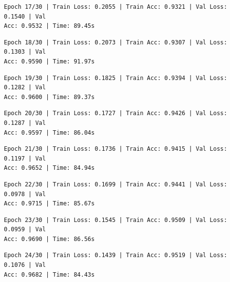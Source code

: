 \documentclass[11pt]{article}
\begin{document}
    \begin{Verbatim}[commandchars=\\\{\}]
Epoch 17/30 | Train Loss: 0.2055 | Train Acc: 0.9321 | Val Loss: 0.1540 | Val
Acc: 0.9532 | Time: 89.45s
    \end{Verbatim}

    \begin{Verbatim}[commandchars=\\\{\}]
Epoch 18/30 | Train Loss: 0.2073 | Train Acc: 0.9307 | Val Loss: 0.1303 | Val
Acc: 0.9590 | Time: 91.97s
    \end{Verbatim}

    \begin{Verbatim}[commandchars=\\\{\}]
Epoch 19/30 | Train Loss: 0.1825 | Train Acc: 0.9394 | Val Loss: 0.1282 | Val
Acc: 0.9600 | Time: 89.37s
    \end{Verbatim}

    \begin{Verbatim}[commandchars=\\\{\}]
Epoch 20/30 | Train Loss: 0.1727 | Train Acc: 0.9426 | Val Loss: 0.1287 | Val
Acc: 0.9597 | Time: 86.04s
    \end{Verbatim}

    \begin{Verbatim}[commandchars=\\\{\}]
Epoch 21/30 | Train Loss: 0.1736 | Train Acc: 0.9415 | Val Loss: 0.1197 | Val
Acc: 0.9652 | Time: 84.94s
    \end{Verbatim}

    \begin{Verbatim}[commandchars=\\\{\}]
Epoch 22/30 | Train Loss: 0.1699 | Train Acc: 0.9441 | Val Loss: 0.0978 | Val
Acc: 0.9715 | Time: 85.67s
    \end{Verbatim}

    \begin{Verbatim}[commandchars=\\\{\}]
Epoch 23/30 | Train Loss: 0.1545 | Train Acc: 0.9509 | Val Loss: 0.0959 | Val
Acc: 0.9690 | Time: 86.56s
    \end{Verbatim}

    \begin{Verbatim}[commandchars=\\\{\}]
Epoch 24/30 | Train Loss: 0.1439 | Train Acc: 0.9519 | Val Loss: 0.1076 | Val
Acc: 0.9682 | Time: 84.43s
    \end{Verbatim}
\end{document}
